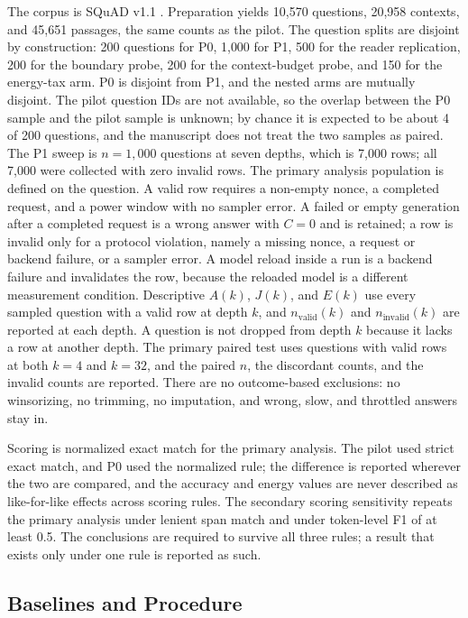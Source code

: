 \documentclass[a4paper,fleqn]{cas-sc}
\begin{document}
The corpus is SQuAD v1.1 \cite{rajpurkar2016squad}. Preparation yields 10{,}570 questions, 20{,}958 contexts, and 45{,}651 passages, the same counts as the pilot. The question splits are disjoint by construction: 200 questions for P0, 1{,}000 for P1, 500 for the reader replication, 200 for the boundary probe, 200 for the context-budget probe, and 150 for the energy-tax arm. P0 is disjoint from P1, and the nested arms are mutually disjoint. The pilot question IDs are not available, so the overlap between the P0 sample and the pilot sample is unknown; by chance it is expected to be about 4 of 200 questions, and the manuscript does not treat the two samples as paired. The P1 sweep is $n=1{,}000$ questions at seven depths, which is 7{,}000 rows; all 7{,}000 were collected with zero invalid rows. The primary analysis population is defined on the question. A valid row requires a non-empty nonce, a completed request, and a power window with no sampler error. A failed or empty generation after a completed request is a wrong answer with $C=0$ and is retained; a row is invalid only for a protocol violation, namely a missing nonce, a request or backend failure, or a sampler error. A model reload inside a run is a backend failure and invalidates the row, because the reloaded model is a different measurement condition. Descriptive $A(k)$, $J(k)$, and $E(k)$ use every sampled question with a valid row at depth $k$, and $n_{\mathrm{valid}}(k)$ and $n_{\mathrm{invalid}}(k)$ are reported at each depth. A question is not dropped from depth $k$ because it lacks a row at another depth. The primary paired test uses questions with valid rows at both $k=4$ and $k=32$, and the paired $n$, the discordant counts, and the invalid counts are reported. There are no outcome-based exclusions: no winsorizing, no trimming, no imputation, and wrong, slow, and throttled answers stay in.

Scoring is normalized exact match for the primary analysis. The pilot used strict exact match, and P0 used the normalized rule; the difference is reported wherever the two are compared, and the accuracy and energy values are never described as like-for-like effects across scoring rules. The secondary scoring sensitivity repeats the primary analysis under lenient span match and under token-level F1 of at least 0.5. The conclusions are required to survive all three rules; a result that exists only under one rule is reported as such.

\subsection{Baselines and Procedure}\label{sec:procedure}
\end{document}
